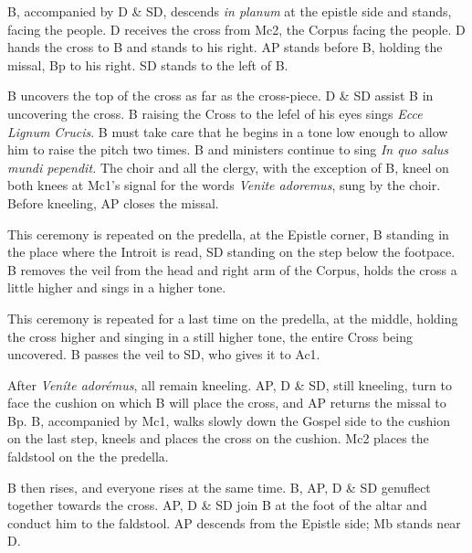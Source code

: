 {    %

    \rubric B, accompanied by D \& SD, descends \textit{in planum} at the
    epistle side and stands, facing the people. D receives the cross from Mc2,
    the Corpus facing the people. D hands the cross to B and stands to his
    right. AP stands before B, holding the missal, Bp to his right. SD stands
    to the left of B.

    \rubric B uncovers the top of the cross as far as the cross-piece. D \& SD
    assist B in uncovering the cross. B raising the Cross to the lefel of his
    eyes sings \textit{Ecce Lignum Crucis}. B must take care that he begins in
    a tone low enough to allow him to raise the pitch two times. B and
    ministers continue to sing \textit{In quo salus mundi pependit.} The choir
    and all the clergy, with the exception of B, kneel on both knees at Mc1's
    signal for the words \textit{Venite adoremus}, sung by the choir. Before
    kneeling, AP closes the missal.

    \rubric This ceremony is repeated on the predella, at the Epistle corner, B
    standing in the place where the Introit is read, SD standing on the step
    below the footpace. B removes the veil from the head and right arm of the
    Corpus, holds the cross a little higher and sings in a higher tone.

    \rubric This ceremony is repeated for a last time on the predella, at the
    middle, holding the cross higher and singing in a still higher tone, the
    entire Cross being uncovered. B passes the veil to SD, who gives it to Ac1.

    \rubric After \textit{Veníte adorémus}, all remain kneeling. AP, D \& SD,
    still kneeling, turn to face the cushion on which B will place the cross,
    and AP returns the missal to Bp. B, accompanied by Mc1, walks slowly down
    the Gospel side to the cushion on the last step, kneels and places the
    cross on the cushion. Mc2 places the faldstool on the the predella.

    \rubric B then rises, and everyone rises at the same time. B, AP, D \& SD
    genuflect together towards the cross. AP, D \& SD join B at the foot of the
    altar and conduct him to the faldstool. AP descends from the Epistle side;
    Mb stands near D.

}
